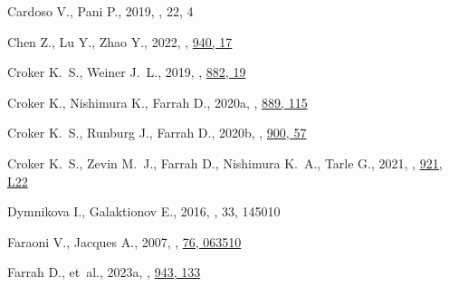 \documentclass[fleqn,usenatbib,useAMS]{mnras}
\begin{document}
\begin{thebibliography}{}
Cardoso V.,  Pani P.,  2019, , 22, 4

Chen Z.,  Lu Y.,   Zhao Y.,  2022, , \href {https://ui.adsabs.harvard.edu/abs/2022ApJ...940...17C} {940, 17}

Croker K.~S.,  Weiner J.~L.,  2019, , \href {https://ui.adsabs.harvard.edu/abs/2019ApJ...882...19C} {882, 19}

Croker K.,  Nishimura K.,   Farrah D.,  2020a, , \href {https://ui.adsabs.harvard.edu/abs/2020ApJ...889..115C} {889, 115}

Croker K.~S.,  Runburg J.,   Farrah D.,  2020b, , \href {https://ui.adsabs.harvard.edu/abs/2020ApJ...889..115C} {900, 57}

Croker K.~S.,  Zevin M.~J.,  Farrah D.,  Nishimura K.~A.,   Tarle G.,  2021, , \href {https://ui.adsabs.harvard.edu/abs/2021ApJ...921L..22C} {921, L22}

Dymnikova I.,  Galaktionov E.,  2016, , 33, 145010

Faraoni V.,  Jacques A.,  2007, , \href {https://ui.adsabs.harvard.edu/abs/2007PhRvD..76f3510F} {76, 063510}

{Farrah} D.,  et~al., 2023a, , \href {https://ui.adsabs.harvard.edu/abs/2023ApJ...943..133F} {943, 133}


\end{thebibliography}
\end{document}
